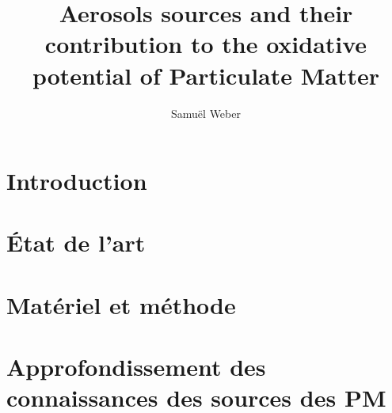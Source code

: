 \documentclass[a4paper,11pt]{book}
\author{Samuël Weber}
\title{Aerosols sources and their contribution to the oxidative potential of Particulate Matter}
\begin{document}
% 
\maketitle

\frontmatter

\clearpage
% 
%

\tableofcontents
\listoftables
\listoffigures


\mainmatter

\chapter*{Introduction}%
\label{cha:introduction}

\clearpage
\printbibliography[segment=\therefsegment,heading=subbibliography]

\chapter{État de l'art}
\label{cha:etat_de_lart}
\PartialToc
\clearpage

\clearpage
\printbibliography[segment=\therefsegment,heading=subbibliography]

\chapter{Matériel et méthode}
\label{cha:materiel_et_methode}
\PartialToc
\clearpage

\clearpage
\printbibliography[segment=\therefsegment,heading=subbibliography]

\chapter{Approfondissement des connaissances des sources des PM}%
\label{cha:approfondissement_des_connaissances_des_sources_des_pm}
\PartialToc
\clearpage

\clearpage
\printbibliography[segment=\therefsegment,heading=subbibliography]
\end{document}

